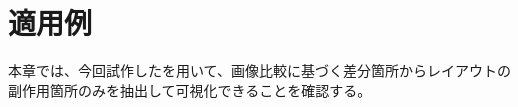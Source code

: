\chapter{適用例}\label{cha:Indication}
本章では、今回試作した\toolName を用いて、画像比較に基づく差分箇所からレイアウトの副作用箇所のみを抽出して可視化できることを確認する。


